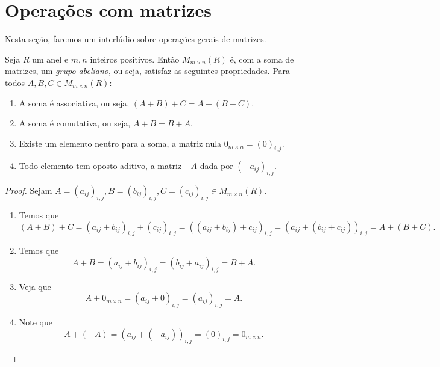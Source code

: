 \section{Operações com matrizes}

Nesta seção, faremos um interlúdio sobre operações gerais de matrizes.

\begin{proposition}
    Seja $R$ um anel e $m, n$ inteiros positivos.
    Então $M_{m \times n}(R)$ é, com a soma de matrizes, um \emph{grupo abeliano}, ou seja, satisfaz as seguintes propriedades. Para todos $A, B, C \in M_{m \times n}(R)$:
    \begin{enumerate}[label=(\roman*)]
        \item A soma é associativa, ou seja, $(A+B)+C=A+(B+C)$.
        \item A soma é comutativa, ou seja, $A+B=B+A$.
        \item Existe um elemento neutro para a soma, a matriz nula $0_{m \times n}=(0)_{i, j}$.
        \item Todo elemento tem oposto aditivo, a matriz $-A$ dada por $(-a_{ij})_{i, j}$.
    \end{enumerate}
\end{proposition}
\begin{proof}
    Sejam $A=(a_{ij})_{i, j}, B=(b_{ij})_{i, j}, C=(c_{ij})_{i, j} \in M_{m \times n}(R)$.
    \begin{enumerate}[label=(\roman*)]
        \item Temos que \begin{equation*}
            (A+B)+C=(a_{ij}+b_{ij})_{i, j}+(c_{ij})_{i, j}=((a_{ij}+b_{ij})+c_{ij})_{i, j}=(a_{ij}+(b_{ij}+c_{ij}))_{i, j}=A+(B+C).
        \end{equation*}
        \item Temos que \begin{equation*}
            A+B=(a_{ij}+b_{ij})_{i, j}=(b_{ij}+a_{ij})_{i, j}=B+A.
        \end{equation*}
        \item Veja que \begin{equation*}
            A+0_{m \times n}=(a_{ij}+0)_{i, j}=(a_{ij})_{i, j}=A.
        \end{equation*}
        \item Note que \begin{equation*}
            A+(-A)=(a_{ij}+(-a_{ij}))_{i, j}=(0)_{i, j}=0_{m \times n}.
        \end{equation*}
    \end{enumerate}
\end{proof}

